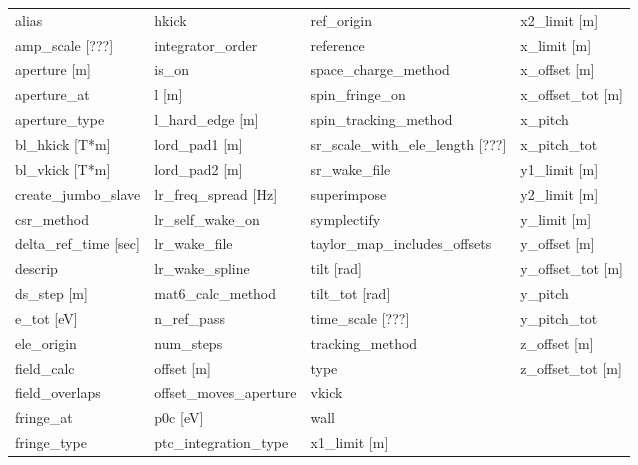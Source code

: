  \begin{tabular}{llll} \toprule
alias                          & hkick                          & ref_origin                     & x2_limit [m]                   \\
amp_scale [???]                & integrator_order               & reference                      & x_limit [m]                    \\
aperture [m]                   & is_on                          & space_charge_method            & x_offset [m]                   \\
aperture_at                    & l [m]                          & spin_fringe_on                 & x_offset_tot [m]               \\
aperture_type                  & l_hard_edge [m]                & spin_tracking_method           & x_pitch                        \\
bl_hkick [T*m]                 & lord_pad1 [m]                  & sr_scale_with_ele_length [???] & x_pitch_tot                    \\
bl_vkick [T*m]                 & lord_pad2 [m]                  & sr_wake_file                   & y1_limit [m]                   \\
create_jumbo_slave             & lr_freq_spread [Hz]            & superimpose                    & y2_limit [m]                   \\
csr_method                     & lr_self_wake_on                & symplectify                    & y_limit [m]                    \\
delta_ref_time [sec]           & lr_wake_file                   & taylor_map_includes_offsets    & y_offset [m]                   \\
descrip                        & lr_wake_spline                 & tilt [rad]                     & y_offset_tot [m]               \\
ds_step [m]                    & mat6_calc_method               & tilt_tot [rad]                 & y_pitch                        \\
e_tot [eV]                     & n_ref_pass                     & time_scale [???]               & y_pitch_tot                    \\
ele_origin                     & num_steps                      & tracking_method                & z_offset [m]                   \\
field_calc                     & offset [m]                     & type                           & z_offset_tot [m]               \\
field_overlaps                 & offset_moves_aperture          & vkick                          &                                \\
fringe_at                      & p0c [eV]                       & wall                           &                                \\
fringe_type                    & ptc_integration_type           & x1_limit [m]                   &                                \\
 \bottomrule
 \end{tabular}
 \vfill
 
